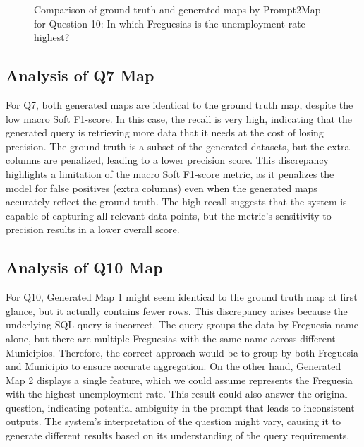   \begin{figure}[htbp]
    \centering
    \begin{minipage}[b]{\textwidth}
      \centering
      \hfill
      \hfill
    \end{minipage}
    \caption{Comparison of ground truth and generated maps by Prompt2Map for Question 10: In which Freguesias is the unemployment rate highest?}
    \label{fig:comparison_q10}
  \end{figure}



\subsection{Analysis of Q7 Map}

For Q7, both generated maps are identical to the ground truth map, despite the low macro Soft F1-score. In this case, the recall is very high, indicating that the generated query is retrieving more data that it needs at the cost of losing precision. The ground truth is a subset of the generated datasets, but the extra columns are penalized, leading to a lower precision score. This discrepancy highlights a limitation of the macro Soft F1-score metric, as it penalizes the model for false positives (extra columns) even when the generated maps accurately reflect the ground truth. The high recall suggests that the system is capable of capturing all relevant data points, but the metric's sensitivity to precision results in a lower overall score. 

\subsection{Analysis of Q10 Map}

For Q10, Generated Map 1 might seem identical to the ground truth map at first glance, but it actually contains fewer rows. This discrepancy arises because the underlying SQL query is incorrect. The query groups the data by Freguesia name alone, but there are multiple Freguesias with the same name across different Municipios. Therefore, the correct approach would be to group by both Freguesia and Municipio to ensure accurate aggregation. On the other hand, Generated Map 2 displays a single feature, which we could assume represents the Freguesia with the highest unemployment rate. This result could also answer the original question, indicating potential ambiguity in the prompt that leads to inconsistent outputs. The system's interpretation of the question might vary, causing it to generate different results based on its understanding of the query requirements.


